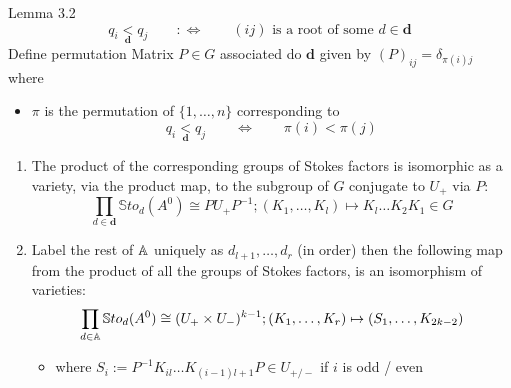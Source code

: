 \begin{frame}{Lemma 3.2}
  \[
    q_i\underset{\textbf{d}}{<}q_j \qquad :\Leftrightarrow
      \qquad (ij) \text{ is a root of some } d\in\textbf{d}
  \]
  Define permutation Matrix $P\in G$ associated do $\textbf{d}$ given by
  $(P)_{ij}=\delta_{\pi(i)j}$ where
  \begin{itemize}
    \item $\pi$ is the permutation of $\{1,\dots,n\}$ corresponding to
    \[
      q_i\underset{\textbf{d}}{<}q_j \qquad \Leftrightarrow \qquad \pi(i)<\pi(j)
    \]
  \end{itemize}
  \begin{lem}[3.2]
    \begin{enumerate}
      \item The product of the corresponding groups of Stokes factors is
      isomorphic as a variety, via the product map, to the subgroup of $G$
      conjugate to $U_+$ via $P$:
      \[
      \prod_{d\in\textbf{d}}\mathbb{S}to_d(A^0)\cong PU_+P^{-1} ;
      (K_1,\dots,K_l)\mapsto K_l\dots K_2K_1\in G
      \]
      \item Label the rest of $\mathbb{A}$ uniquely as $d_{l+1},\dots,d_r$ (in order)
      then the following map from the product of all the groups of Stokes
      factors, is an isomorphism of varieties:
      \[
      \prod_{d\in\mathbb{A}}\mathbb{S}to_d(A^0)\cong (U_+\times U_-)^{k-1} ;
      (K_1,\dots,K_r)\mapsto (S_1,\dots,K_{2k-2})
      \]
      \begin{itemize}
        \item where $S_i:=P^{-1}K_{il}\dots K_{(i-1)l+1}P\in U_{+/-}$ if $i$ is
        odd / even
      \end{itemize}
    \end{enumerate}
  \end{lem}
\end{frame}

